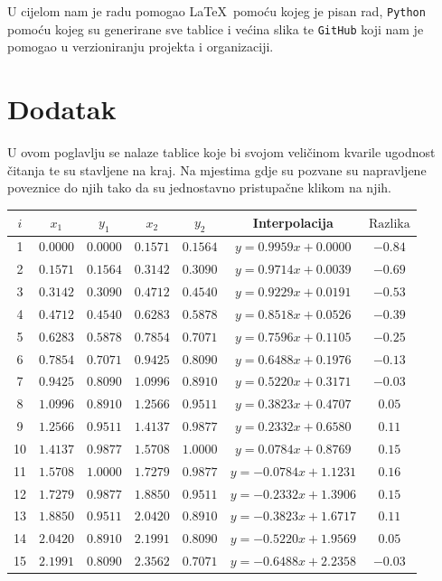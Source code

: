 \documentclass[12pt,a4paper]{report}
\begin{document}
U cijelom nam je radu pomogao \LaTeX\ pomoću kojeg je pisan rad, \texttt{Python} pomoću kojeg su generirane sve tablice i većina slika te \texttt{GitHub} koji nam je pomogao u verzioniranju projekta i organizaciji.
\chapter{Dodatak}
	U ovom poglavlju se nalaze tablice koje bi svojom veličinom kvarile ugodnost čitanja te su stavljene na kraj. Na mjestima gdje su pozvane su napravljene poveznice do njih tako da su jednostavno pristupačne klikom na njih.
		\begin{table}
	\begin{center}		
		\begin{tabular}{c | c c | c c | c | c}
			$i$&$x_1$&$y_1$&$x_2$&$y_2$&Interpolacija&$\text{Razlika}$\\\hline
			1 &$0.0000$&$0.0000$&$0.1571$&$0.1564$&$y =  0.9959x+0.0000$&$-0.84$\\
			2 &$0.1571$&$0.1564$&$0.3142$&$0.3090$&$y =  0.9714x+0.0039$&$-0.69$\\
			3 &$0.3142$&$0.3090$&$0.4712$&$0.4540$&$y =  0.9229x+0.0191$&$-0.53$\\
			4 &$0.4712$&$0.4540$&$0.6283$&$0.5878$&$y =  0.8518x+0.0526$&$-0.39$\\
			5 &$0.6283$&$0.5878$&$0.7854$&$0.7071$&$y =  0.7596x+0.1105$&$-0.25$\\
			6 &$0.7854$&$0.7071$&$0.9425$&$0.8090$&$y =  0.6488x+0.1976$&$-0.13$\\
			7 &$0.9425$&$0.8090$&$1.0996$&$0.8910$&$y =  0.5220x+0.3171$&$-0.03$\\
			8 &$1.0996$&$0.8910$&$1.2566$&$0.9511$&$y =  0.3823x+0.4707$&$0.05$\\
			9 &$1.2566$&$0.9511$&$1.4137$&$0.9877$&$y =  0.2332x+0.6580$&$0.11$\\
			10 &$1.4137$&$0.9877$&$1.5708$&$1.0000$&$y =  0.0784x+0.8769$&$0.15$\\
			11 &$1.5708$&$1.0000$&$1.7279$&$0.9877$&$y = -0.0784x+1.1231$&$0.16$\\
			12 &$1.7279$&$0.9877$&$1.8850$&$0.9511$&$y = -0.2332x+1.3906$&$0.15$\\
			13 &$1.8850$&$0.9511$&$2.0420$&$0.8910$&$y = -0.3823x+1.6717$&$0.11$\\
			14 &$2.0420$&$0.8910$&$2.1991$&$0.8090$&$y = -0.5220x+1.9569$&$0.05$\\
			15 &$2.1991$&$0.8090$&$2.3562$&$0.7071$&$y = -0.6488x+2.2358$&$-0.03$\\

\end{tabular}
\end{center}
\end{table}
\end{document}
